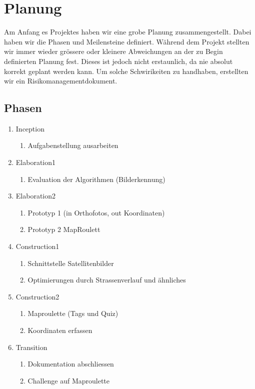\section{Planung}
Am Anfang es Projektes haben wir eine grobe Planung zusammengestellt. Dabei haben wir die Phasen und Meilensteine definiert. Während dem Projekt stellten wir immer wieder grössere oder kleinere Abweichungen an der zu Begin definierten Planung fest. Dieses ist jedoch nicht erstaunlich, da nie absolut korrekt geplant werden kann. Um solche Schwirikeiten zu handhaben, erstellten wir ein Risikomanagementdokument.

\subsection{Phasen}
\begin{enumerate}
  \item Inception
  \begin{enumerate}
    \item Aufgabenstellung ausarbeiten
  \end{enumerate}
  \item Elaboration1
  \begin{enumerate}
    \item Evaluation der Algorithmen (Bilderkennung)
  \end{enumerate}
  \item Elaboration2
  \begin{enumerate}
    \item Prototyp 1 (in Orthofotos, out Koordinaten)
    \item Prototyp 2 MapRoulett
  \end{enumerate}
  \item Construction1
  \begin{enumerate}
    \item Schnittstelle Satellitenbilder
    \item Optimierungen durch Strassenverlauf und ähnliches
  \end{enumerate}
  \item Construction2
  \begin{enumerate}
    \item Maproulette (Tags und Quiz)
    \item Koordinaten erfassen	
  \end{enumerate}
  \item Transition
  \begin{enumerate}
    \item Dokumentation abschliessen
    \item Challenge auf Maproulette
  \end{enumerate}
\end{enumerate}
\newpage


